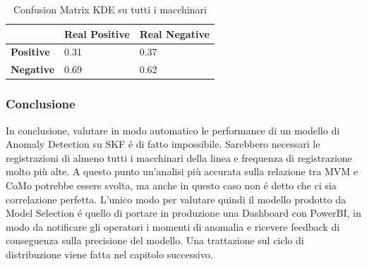 \begin{table}[]
	\centering
	\begin{tabular}{|l|l|l|}
		\hline
		                  & \textbf{Real Positive} & \textbf{Real Negative} \\ \hline
		\textbf{Positive} & 0.31            & 0.37            \\ \hline
		\textbf{Negative} & 0.69            & 0.62            \\ \hline
	\end{tabular}
	\caption{\label{cm_quality_all}Confusion Matrix KDE su tutti i macchinari}
	
\end{table}

\subsubsection{Conclusione}
In conclusione, valutare in modo automatico le performance di un modello di Anomaly Detection su SKF é di fatto impossibile. Sarebbero necessari le registrazioni di almeno tutti i macchinari della linea e frequenza di registrazione molto più alte. A questo punto un'analisi più accurata sulla relazione tra MVM e CoMo potrebbe essere svolta, ma anche in questo caso non é detto che ci sia correlazione perfetta.
L'unico modo per valutare quindi il modello prodotto da Model Selection é quello di portare in produzione una Dashboard con PowerBI, in modo da notificare gli operatori i momenti di anomalia e ricevere feedback di conseguenza sulla precisione del modello.
Una trattazione sul ciclo di distribuzione viene fatta nel capitolo successivo.